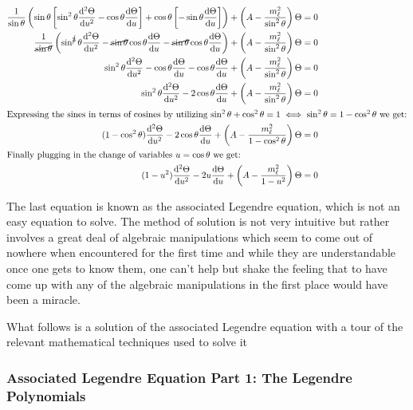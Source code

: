 \documentclass{article}
\begin{document}
    \begin{align}
        \frac{1}{\sin\theta}\left(\sin\theta\left[ \sin^2\theta\odv[order = 2]{\Theta}{u} - \cos\theta\odv{\Theta}{u} \right] + 
        \cos\theta\left[ -\sin\theta\odv{\Theta}{u} \right]\right) + \left( A - \frac{m_{\ell}^2}{\sin^2\theta} \right)\Theta &= 0 \\
        \frac{1}{\cancel{\sin\theta}}\left(\sin^{\cancel{3}}\theta\odv[order = 2]{\Theta}{u} - \cancel{\sin\theta}\cos\theta\odv{\Theta}{u} -  
        \cancel{\sin\theta}\cos\theta\odv{\Theta}{u}\right) + \left( A - \frac{m_{\ell}^2}{\sin^2\theta} \right)\Theta &= 0 \\
        \sin^{2}\theta\odv[order = 2]{\Theta}{u} - \cos\theta\odv{\Theta}{u} - \cos\theta\odv{\Theta}{u} + \left( A - \frac{m_{\ell}^2}{\sin^2\theta} \right)\Theta &= 0 \\
        \sin^{2}\theta\odv[order = 2]{\Theta}{u} - 2\cos\theta\odv{\Theta}{u} + \left( A - \frac{m_{\ell}^2}{\sin^2\theta} \right)\Theta &= 0 \\
        \intertext{Expressing the sines in terms of cosines by utilizing $\sin^2\theta + \cos^2\theta = 1 \iff \sin^2\theta = 1 - \cos^2\theta$ we get:}
        (1 - \cos^2\theta)\odv[order = 2]{\Theta}{u} - 2\cos\theta\odv{\Theta}{u} + \left( A - \frac{m_{\ell}^2}{1 - \cos^2\theta} \right)\Theta &= 0 \\
        \intertext{Finally plugging in the change of variables $u = \cos\theta$ we get:}
        (1 - u^2)\odv[order = 2]{\Theta}{u} - 2u\odv{\Theta}{u} + \left( A - \frac{m_{\ell}^2}{1 - u^2} \right)\Theta &= 0
    \end{align}

    The last equation is known as the associated Legendre equation, which is not an easy equation to solve. The method of solution is not very intuitive but rather
    involves a great deal of algebraic manipulations which seem to come out of nowhere when encountered for the first time and while they are understandable once
    one gets to know them, one can't help but shake the feeling that to have come up with any of the algebraic manipulations in the first place would have been a miracle.

    What follows is a solution of the associated Legendre equation with a tour of the relevant mathematical techniques used to solve it

    \subsubsection{Associated Legendre Equation Part 1: The Legendre Polynomials}
    
\end{document}
